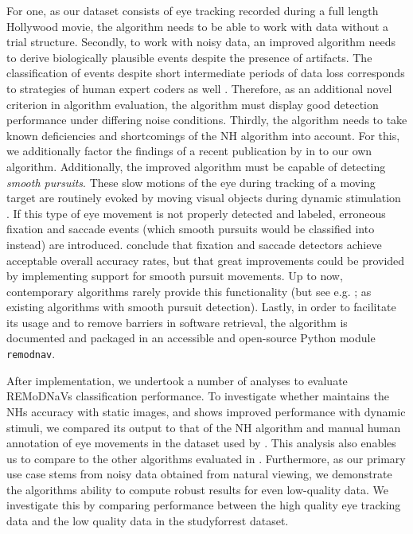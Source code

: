 For one, as our dataset consists of eye tracking recorded during a full length
Hollywood movie, the algorithm needs to be able to work with data without a
trial structure.  Secondly, to work with noisy data, an improved algorithm
needs to derive biologically plausible events despite the presence of
artifacts. The classification of events despite short intermediate periods of
data loss corresponds to strategies of human expert coders as well
\citep{Hooge2018}. Therefore, as an additional novel criterion in algorithm
evaluation, the algorithm must display good detection performance under
differing noise conditions. Thirdly, the algorithm needs to take known
deficiencies and shortcomings of the NH algorithm into account. For this, we
additionally factor the findings of a recent publication by \cite{Friedman2018}
in to our own algorithm.  Additionally, the improved algorithm must be capable
of detecting \textit{smooth pursuits}. These slow motions of the eye during
tracking of a moving target are routinely evoked by moving visual objects
during dynamic stimulation \citep{carl1987pursuits}. If this type of eye
movement is not properly detected and labeled, erroneous fixation and saccade
events (which smooth pursuits would be classified into instead) are introduced.
\cite{Andersson2017} conclude that fixation and saccade detectors achieve
acceptable overall accuracy rates, but that great improvements could be
provided by implementing support for smooth pursuit movements. Up to now,
contemporary algorithms rarely provide this functionality (but see e.g.
\cite{LARSSON2015145}; \cite{Komogortsev2013} as existing algorithms with
smooth pursuit detection).  Lastly, in order to facilitate its usage and to
remove barriers in software retrieval, the \remodnav algorithm is documented
and packaged in an accessible and open-source Python module \texttt{remodnav}.


After implementation, we undertook a number of analyses to evaluate REMoDNaVs
classification performance. To investigate whether \remodnav maintains the NHs
accuracy with static images, and shows improved performance with dynamic
stimuli, we compared its output to that of the NH algorithm and manual human
annotation of eye movements in the dataset used by \cite{Andersson2017}. This
analysis also enables us to compare \remodnav to the other algorithms evaluated
in \citet{Andersson2017}. Furthermore, as our primary use case stems from noisy
data obtained from natural viewing, we demonstrate the algorithms ability to
compute robust results for even low-quality data.  We investigate this by
comparing performance between the high quality eye tracking data and the low
quality data in the studyforrest dataset.


